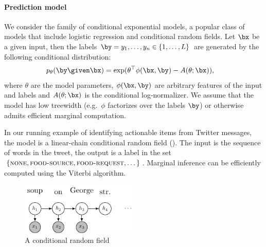 \paragraph{Prediction model}
We consider the family of conditional exponential models, a popular class of models that include logistic regression and conditional random fields.
Let $\bx$ be a given input, then the labels $\by = y_1, \ldots, y_n \in \{1, \dots, L\}$ are generated by the following conditional distribution:
\begin{align*}
  \p(\by \given \bx) 
  &= \exp( \theta^\top \phi(\bx, \by) - A(\theta; \bx)),
\end{align*}
where $\theta$ are the model parameters,
$\phi(\bx, \by)$ are arbitrary features of the input and labels and 
$A(\theta; \bx)$ is the conditional log-normalizer.
We assume that the model has low treewidth (e.g.\ $\phi$ factorizes over the labels $\by$) or otherwise admits efficient marginal computation.

In our running example of identifying actionable items from Twitter messages, the model is a linear-chain conditional random field (). The input is the sequence of words in the tweet, the output is a label in the set $\{\textsc{none}, \textsc{food-source},  \textsc{food-request}, \dots\}$. Marginal inference can be efficiently computed using the Viterbi algorithm.


\begin{figure}[t]
  \begin{centering}
  \includegraphics[width=0.5\textwidth]{figures/simple-crf.pdf}
  \end{centering}
  \caption{A conditional random field }
\label{fig:crf}
\end{figure}

